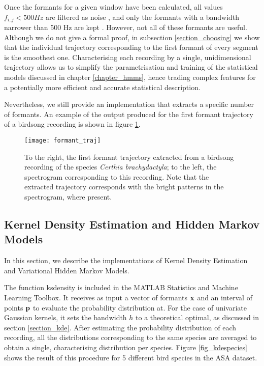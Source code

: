 \documentclass[../main.tex]{subfiles}
\begin{document}
\par Once the formants for a given window have been calculated, all values $f_{i, j} < 500 Hz$ are filtered as noise \cite{Stowell2014}, and only the formants with a bandwidth narrower than 500 Hz are kept \cite{Mathworks2015}. However, not all of these formants are useful. Although we do not give a formal proof, in subsection \ref{section_choosing} we show that the individual trajectory corresponding to the first formant of every segment is the smoothest one. Characterising each recording by a single, unidimensional trajectory allows us to simplify the parametrisation and training of the statistical models discussed in chapter \ref{chapter_hmms}, hence trading complex features for a potentially more efficient and accurate statistical description.
\par Nevertheless, we still provide an implementation that extracts a specific number of formants. An example of the output produced for the first formant trajectory of a birdsong recording is shown in figure \ref{fig_traj}.

\begin{figure}[t]
\centering
\texttt{[image: formant\_traj]}
\caption{To the right, the first formant trajectory extracted from a birdsong recording of the species \emph{Certhia brachydactyla}; to the left, the spectrogram corresponding to this recording. Note that the extracted trajectory corresponds with the bright patterns in the spectrogram, where present.}
\label{fig_traj}
\end{figure}

\subsection{Kernel Density Estimation and Hidden Markov Models} \label{section_imphmms}
In this section, we describe the implementations of Kernel Density Estimation and Variational Hidden Markov Models.
\par The function ksdensity is included in the MATLAB Statistics and Machine Learning Toolbox. It receives as input a vector of formants $\mathbf{x}$ and an interval of points $\mathbf{p}$ to evaluate the probability distribution at. For the case of univariate Gaussian kernels, it sets the bandwidth $h$ to a theoretical optimal, as discussed in section \ref{section_kde}. After estimating the probability distribution of each recording, all the distributions corresponding to the same species are averaged to obtain a single, characterising distribution per species. Figure \ref{fig_kdespecies} shows the result of this procedure for 5 different bird species in the ASA dataset.
\end{document}
